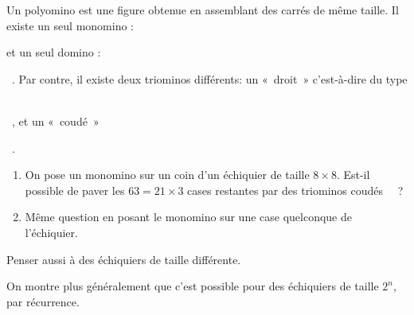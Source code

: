 \begin{exo}[Polyominos]
Un polyomino est une figure obtenue en assemblant des carrés de même taille. Il existe un seul monomino : 
 et un seul domino : 
   ~. Par contre, il existe deux triominos différents: un «~droit~» c'est-à-dire du type ~
  ~, et un «~coudé~» ~
  ~.
\begin{enumerate}
\item  On pose un monomino sur un coin d'un échiquier de taille $8\times 8$. Est-il possible de paver les $63=21\times 3$ cases restantes par des  triominos coudés ~~? 
  \item Même question en posant le monomino sur une case quelconque de l'échiquier.
  \end{enumerate}
\begin{hint}
Penser aussi à des échiquiers de taille différente.
\end{hint}
\begin{sol}
On montre plus généralement que c'est possible pour des échiquiers de taille $2^n$, par récurrence.
\end{sol}
\end{exo}

